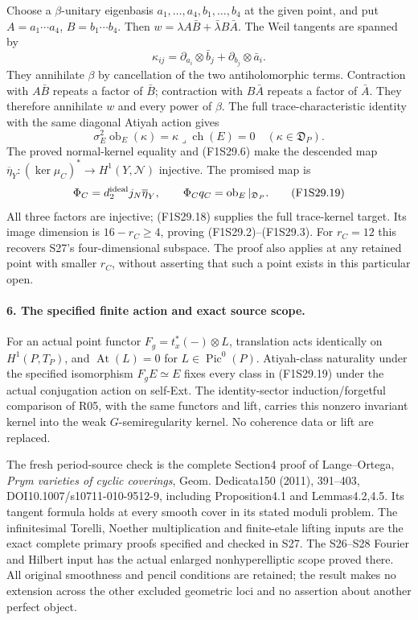 Choose a $\beta$-unitary eigenbasis
$a_1,\ldots,a_4,b_1,\ldots,b_4$ at the given point,
and put $A=a_1\cdots a_4$, $B=b_1\cdots b_4$.
Then $w=\lambda A\bar B+\bar\lambda B\bar A$.
The Weil tangents are spanned by
\[
 \kappa_{ij}=\partial_{a_i}\otimes\bar b_j
                       +\partial_{b_j}\otimes\bar a_i.
 \tag{F1S29.17}
\]
They annihilate $\beta$ by cancellation of the two
antiholomorphic terms. Contraction with $A\bar B$
repeats a factor of $\bar B$; contraction with
$B\bar A$ repeats a factor of $\bar A$.
They therefore annihilate $w$ and every power of
$\beta$. The full trace-characteristic identity
with the same diagonal Atiyah action gives
\[
 \sigma_E^2\operatorname{ob}_E(\kappa)
      =\kappa\mathbin{\lrcorner}\operatorname{ch}(E)=0
                         \quad(\kappa\in\mathfrak D_P).
 \tag{F1S29.18}
\]
The proved normal-kernel equality and (F1S29.6)
make the descended map
$\overline\eta_Y:(\ker\mu_C)^*\to H^1(Y,\mathscr N)$
injective. The promised map is
\[
 \Phi_C=d^{\rm ideal}_2j_N\overline\eta_Y,\qquad
           \Phi_Cq_C=\operatorname{ob}_E|_{\mathfrak D_P}.
 \tag{F1S29.19}
\]
All three factors are injective; (F1S29.18) supplies
the full trace-kernel target. Its image dimension
is $16-r_C\ge4$, proving (F1S29.2)--(F1S29.3).
For $r_C=12$ this recovers S27's four-dimensional
subspace. The proof also applies at any retained
point with smaller $r_C$, without asserting that
such a point exists in this particular open.

\paragraph{6. The specified finite action and exact source scope.}
For an actual point functor $F_g=t_x^*(-)\otimes L$,
translation acts identically on $H^1(P,T_P)$,
and $\operatorname{At}(L)=0$ for $L\in\operatorname{Pic}^0(P)$.
Atiyah-class naturality under the specified
isomorphism $F_gE\simeq E$ fixes every class
in (F1S29.19) under the actual conjugation action
on self-Ext. The identity-sector induction/forgetful
comparison of R05, with the same functors and lift,
carries this nonzero invariant kernel into the
weak $G$-semiregularity kernel. No coherence data
or lift are replaced.

The fresh period-source check is the complete
Section4 proof of Lange--Ortega, \emph{Prym varieties
of cyclic coverings}, Geom. Dedicata150 (2011),
391--403, DOI10.1007/s10711-010-9512-9, including
Proposition4.1 and Lemmas4.2,4.5. Its tangent
formula holds at every smooth cover in its
stated moduli problem. The infinitesimal Torelli,
Noether multiplication and finite-etale lifting
inputs are the exact complete primary proofs
specified and checked in S27. The S26--S28
Fourier and Hilbert input has the actual enlarged
nonhyperelliptic scope proved there. All original
smoothness and pencil conditions are retained;
the result makes no extension across the other
excluded geometric loci and no assertion about
another perfect object.

